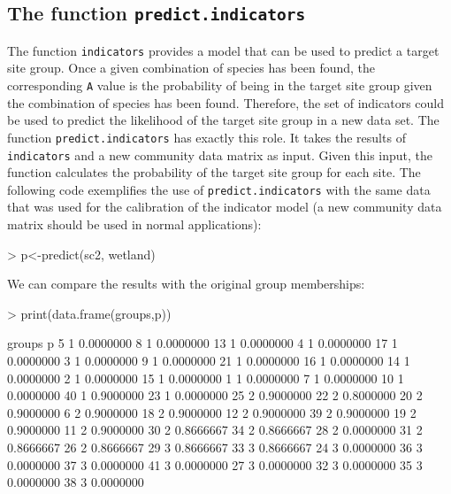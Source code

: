 \documentclass[11pt,a4paper]{article}
\begin{document}
\subsection{The function \texttt{predict.indicators}}
The function \texttt{indicators} provides a model that can be used to predict a target site group. Once a given combination of species has been found, the corresponding \texttt{A} value is the probability of being in the target site group given the combination of species has been found. Therefore, the set of indicators could be used to predict the likelihood of the target site group in a new data set. The function \texttt{predict.indicators} has exactly this role. It takes the results of \texttt{indicators} and a new community data matrix as input. Given this input, the function calculates the probability of the target site group for each site. The following code exemplifies the use of \texttt{predict.indicators} with the same data that was used for the calibration of the indicator model (a new community data matrix should be used in normal applications):
\begin{Schunk}
\begin{Sinput}
> p<-predict(sc2, wetland)
\end{Sinput}
\end{Schunk}
We can compare the results with the original group memberships:
\begin{Schunk}
\begin{Sinput}
> print(data.frame(groups,p))
\end{Sinput}
\begin{Soutput}
   groups         p
5       1 0.0000000
8       1 0.0000000
13      1 0.0000000
4       1 0.0000000
17      1 0.0000000
3       1 0.0000000
9       1 0.0000000
21      1 0.0000000
16      1 0.0000000
14      1 0.0000000
2       1 0.0000000
15      1 0.0000000
1       1 0.0000000
7       1 0.0000000
10      1 0.0000000
40      1 0.9000000
23      1 0.0000000
25      2 0.9000000
22      2 0.8000000
20      2 0.9000000
6       2 0.9000000
18      2 0.9000000
12      2 0.9000000
39      2 0.9000000
19      2 0.9000000
11      2 0.9000000
30      2 0.8666667
34      2 0.8666667
28      2 0.0000000
31      2 0.8666667
26      2 0.8666667
29      3 0.8666667
33      3 0.8666667
24      3 0.0000000
36      3 0.0000000
37      3 0.0000000
41      3 0.0000000
27      3 0.0000000
32      3 0.0000000
35      3 0.0000000
38      3 0.0000000
\end{Soutput}
\end{Schunk}


\end{document}
